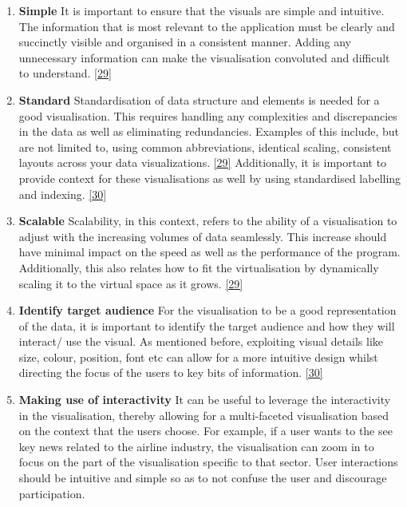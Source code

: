 \begin{enumerate}
\item \textbf{Simple}
It is important to ensure that the visuals are simple and intuitive. The information that is most relevant to the application must be clearly and succinctly visible and organised in a consistent manner. Adding any unnecessary information can make the visualisation convoluted and difficult to understand. \hyperlink{29}{[29]}

\item \textbf{Standard}
Standardisation of data structure and elements is needed for a good visualisation. This requires handling any complexities and discrepancies in the data as well as eliminating redundancies. Examples of this include, but are not limited to, using common abbreviations, identical scaling, consistent layouts across your data visualizations. \hyperlink{29}{[29]} Additionally, it is important to provide context for these visualisations as well by using standardised labelling and indexing. \hyperlink{30}{[30]}

\item \textbf{Scalable}
Scalability, in this context, refers to the ability of a visualisation to adjust with the increasing volumes of data seamlessly. This increase should have minimal impact on the speed as well as the performance of the program. Additionally, this also relates how to fit the virtualisation by dynamically scaling it to the virtual space as it grows. \hyperlink{29}{[29]}

\item \textbf{Identify target audience}
 For the visualisation to be a good representation of the data, it is important to identify the target audience and how they will interact/ use the visual. As mentioned before, exploiting visual details like size, colour, position, font etc can allow for a more intuitive design whilst directing the focus of the users to key bits of information. \hyperlink{30}{[30]}

\item \textbf{Making use of interactivity}
It can be useful to leverage the interactivity in the visualisation, thereby allowing for a multi-faceted visualisation based on the context that the users choose. For example, if a user wants to the see key news related to the airline industry, the visualisation can zoom in to focus on the part of the visualisation specific to that sector. User interactions should be intuitive and simple so as to not confuse the user and discourage participation. 

\end{enumerate}